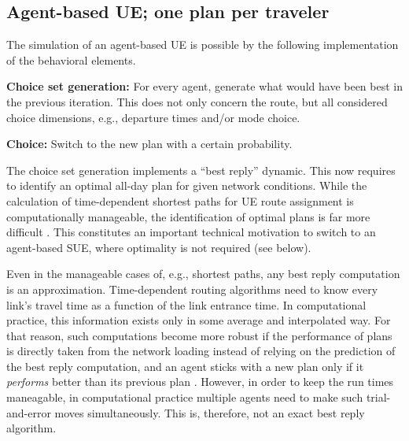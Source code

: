 \subsection{Agent-based UE; one plan per traveler}
\label{sec:agent-based-ue}

The simulation of an agent-based UE is possible by the following 
implementation of the behavioral elements.

%
%
%
%

\textbf{Choice set generation:} For every agent,
  generate what would have been best in the previous iteration.
  This does not only concern the route,
  but all considered choice dimensions, e.g., departure times and/or
  mode choice. 

\textbf{Choice:} Switch to the new plan with a
  certain probability.

The choice set generation implements a ``best reply'' dynamic. 
This now requires to identify an optimal all-day plan for given network conditions. 
While the calculation of time-dependent shortest paths for UE route assignment is 
computationally manageable, the identification of optimal plans is far more difficult 
\citep[][]{recker-2001}. 
This constitutes an important technical motivation to switch to an agent-based SUE, 
where optimality is not required (see below).

Even in the manageable cases of, e.g., shortest paths, 
any best reply computation is an approximation.  
Time-dependent routing algorithms need to know every link's travel
time as a function of the link entrance time.  In computational
practice, this information exists only in some average and
interpolated way.  For that reason, such computations become more
robust if the performance of plans is directly taken from the network
loading instead of relying on the prediction of the best reply
computation, and an agent sticks with a new plan only if it
\emph{performs} better than its previous plan
\citep{RaneyNagel2004agdb}.  However, in order to keep the run times
maneagable, in computational practice multiple agents need to make
such trial-and-error moves simultaneously.  This is, therefore, not an
exact best reply algorithm.

